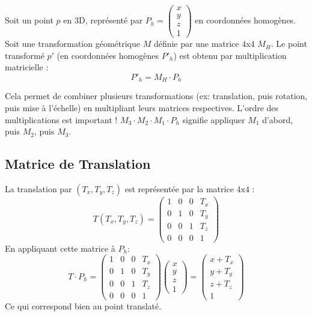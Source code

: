 \documentclass{article}
\begin{document}
Soit un point $p$ en 3D, représenté par $P_h = \begin{pmatrix} x \\ y \\ z \\ 1 \end{pmatrix}$ en coordonnées homogènes.
Soit une transformation géométrique $M$ définie par une matrice 4x4 $M_H$.
Le point transformé $p'$ (en coordonnées homogènes $P'_h$) est obtenu par multiplication matricielle :
\[ P'_h = M_H \cdot P_h \]

Cela permet de combiner plusieurs transformations (ex: translation, puis rotation, puis mise à l'échelle) en multipliant leurs matrices respectives. L'ordre des multiplications est important ! $M_3 \cdot M_2 \cdot M_1 \cdot P_h$ signifie appliquer $M_1$ d'abord, puis $M_2$, puis $M_3$.

\subsection{Matrice de Translation}
La translation par $(T_x, T_y, T_z)$ est représentée par la matrice 4x4 :
\[ T(T_x, T_y, T_z) = \begin{pmatrix}
1 & 0 & 0 & T_x \\
0 & 1 & 0 & T_y \\
0 & 0 & 1 & T_z \\
0 & 0 & 0 & 1
\end{pmatrix} \]
En appliquant cette matrice à $P_h$:
\[ T \cdot P_h = \begin{pmatrix}
1 & 0 & 0 & T_x \\
0 & 1 & 0 & T_y \\
0 & 0 & 1 & T_z \\
0 & 0 & 0 & 1
\end{pmatrix} \begin{pmatrix} x \\ y \\ z \\ 1 \end{pmatrix} = \begin{pmatrix} x + T_x \\ y + T_y \\ z + T_z \\ 1 \end{pmatrix} \]
Ce qui correspond bien au point translaté.
\end{document}
